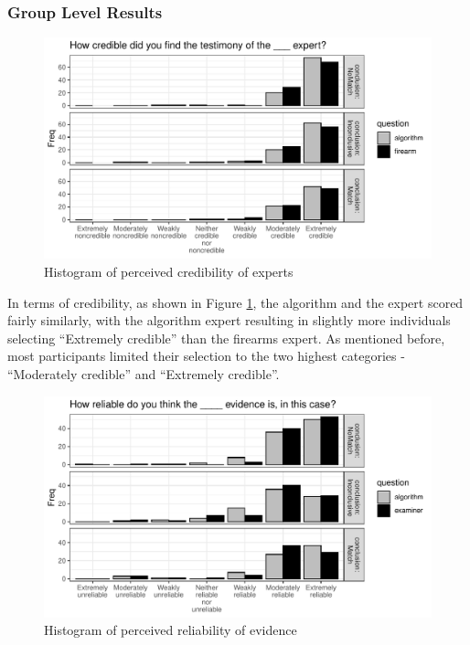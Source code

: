 \documentclass[print]{nuthesis}
\begin{document}
\hypertarget{group-level-results}{%
\subsubsection{Group Level Results}\label{group-level-results}}

\begin{figure}

{\centering \includegraphics[width=\linewidth]{thesis_files/figure-latex/histcred-1} 

}

\caption{Histogram of perceived credibility of experts}\label{fig:histcred}
\end{figure}

In terms of credibility, as shown in Figure \ref{fig:histcred}, the algorithm and the expert scored fairly similarly, with the algorithm expert resulting in slightly more individuals selecting ``Extremely credible'' than the firearms expert.
As mentioned before, most participants limited their selection to the two highest categories - ``Moderately credible'' and ``Extremely credible''.

\begin{figure}

{\centering \includegraphics[width=\linewidth]{thesis_files/figure-latex/histrel-1} 

}

\caption{Histogram of perceived reliability of evidence}\label{fig:histrel}
\end{figure}
\end{document}
